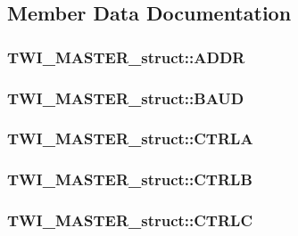 \subsection{Member Data Documentation}
\hypertarget{struct_t_w_i___m_a_s_t_e_r__struct_a449768ab77f1af722867a7a936227c91}{
\subsubsection[{ADDR}]{ {\bf TWI\_\-MASTER\_\-struct::ADDR}}}
\label{struct_t_w_i___m_a_s_t_e_r__struct_a449768ab77f1af722867a7a936227c91}
\hypertarget{struct_t_w_i___m_a_s_t_e_r__struct_acaaf4bbb5de65800b100ec77d9b743c8}{
\subsubsection[{BAUD}]{ {\bf TWI\_\-MASTER\_\-struct::BAUD}}}
\label{struct_t_w_i___m_a_s_t_e_r__struct_acaaf4bbb5de65800b100ec77d9b743c8}
\hypertarget{struct_t_w_i___m_a_s_t_e_r__struct_ac4c9558296f78de70aea7220a369f8d0}{
\subsubsection[{CTRLA}]{ {\bf TWI\_\-MASTER\_\-struct::CTRLA}}}
\label{struct_t_w_i___m_a_s_t_e_r__struct_ac4c9558296f78de70aea7220a369f8d0}
\hypertarget{struct_t_w_i___m_a_s_t_e_r__struct_a6bec6f15f02825dbd6eeb1b47b9f5c59}{
\subsubsection[{CTRLB}]{ {\bf TWI\_\-MASTER\_\-struct::CTRLB}}}
\label{struct_t_w_i___m_a_s_t_e_r__struct_a6bec6f15f02825dbd6eeb1b47b9f5c59}
\hypertarget{struct_t_w_i___m_a_s_t_e_r__struct_a8294d4047384a14284395f25c4c8e1fa}{
\subsubsection[{CTRLC}]{ {\bf TWI\_\-MASTER\_\-struct::CTRLC}}}
